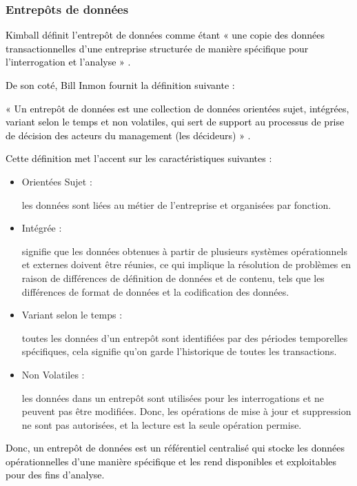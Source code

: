 \documentclass[a4paper,12pt]{report}
\begin{document}
\subsubsection{Entrepôts de données}
\textcolor{black}{Kimball définit l’entrepôt de données comme étant « une copie des données transactionnelles d’une entreprise structurée de manière spécifique pour l’interrogation et l’analyse » \citep{kimball1996data}.}

\textcolor{black}{De son coté, Bill Inmon fournit la définition suivante :}

\textcolor{black}{« Un entrepôt de données est  une collection de données orientées sujet, intégrées, variant selon le temps et non volatiles, qui sert de support au processus de prise de décision des acteurs du management (les décideurs) » \citep{inmon1996building}.}

\textcolor{black}{Cette définition met l’accent sur les caractéristiques suivantes :}

\begin{itemize}
	\item  \begin{bf}Orientées Sujet : \end{bf}les données sont liées au métier de l’entreprise et organisées par fonction.
	\item  \begin{bf}Intégrée :  \end{bf}signifie que les données obtenues à partir de plusieurs systèmes opérationnels et externes doivent être réunies, ce qui implique la résolution de problèmes en raison de  différences de définition de données et de contenu, tels que les différences de format de données et la codification des données.
	\item  \begin{bf}Variant selon le temps : \end{bf}toutes les données d’un entrepôt sont identifiées par des périodes temporelles spécifiques, cela signifie qu’on garde l’historique de toutes les transactions.
	\item  \begin{bf}Non Volatiles :\end{bf}les données dans un entrepôt sont utilisées pour les interrogations et ne peuvent pas être modifiées. Donc, les opérations de mise à jour et suppression ne sont pas autorisées, et la lecture est la seule opération permise.
\end{itemize}

\textcolor{black}{Donc, un entrepôt de données est un référentiel centralisé qui stocke les données opérationnelles d’une manière spécifique et les rend disponibles et exploitables pour des fins d’analyse. }
\end{document}
